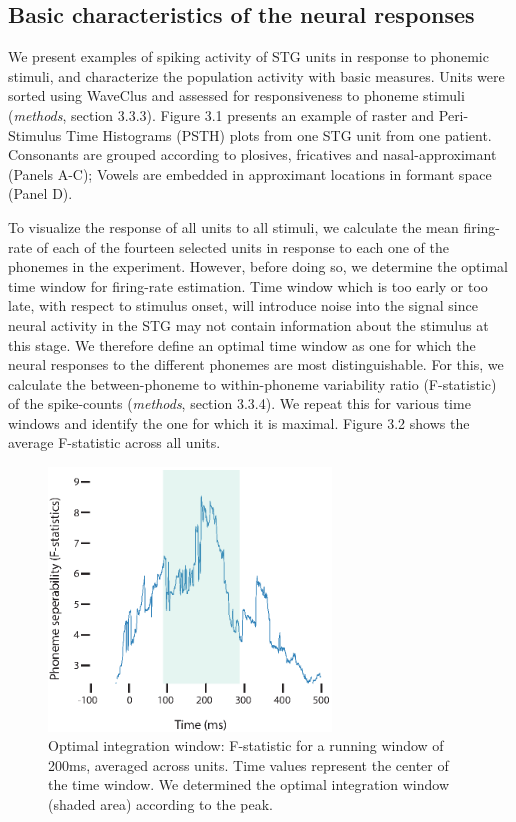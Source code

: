 \subsection{Basic characteristics of the neural responses}
We present examples of spiking activity of STG units in response to phonemic stimuli, and characterize the population activity with basic measures. Units were sorted using WaveClus and assessed for responsiveness to phoneme stimuli (\textit{methods}, section 3.3.3). Figure 3.1 presents an example of raster and Peri-Stimulus Time Histograms (PSTH) plots from one STG unit from one patient. Consonants are grouped according to plosives, fricatives and nasal-approximant (Panels A-C); Vowels are embedded in approximant locations in formant space (Panel D). 


To visualize the response of all units to all stimuli, we calculate the mean firing-rate of each of the fourteen selected units in response to each one of the phonemes in the experiment. However, before doing so, we determine the optimal time window for firing-rate estimation. Time window which is too early or too late, with respect to stimulus onset, will introduce noise into the signal since neural activity in the STG may not contain information about the stimulus at this stage. We therefore define an optimal time window as one for which the neural responses to the different phonemes are most distinguishable. For this, we calculate the between-phoneme to within-phoneme variability ratio (F-statistic) of the spike-counts (\textit{methods}, section 3.3.4). We repeat this for various time windows and identify the one for which it is maximal. Figure 3.2 shows the average F-statistic across all units.

\begin{figure}
\vspace{.3in}
\includegraphics[width=\linewidth, height=7cm]{Figures/Ch3/Figure1_new.eps}
\caption{Optimal integration window: F-statistic for a running window of 200ms, averaged across units. Time values represent the center of the time window. We determined the optimal integration window (shaded area) according to the peak.}
\end{figure}

